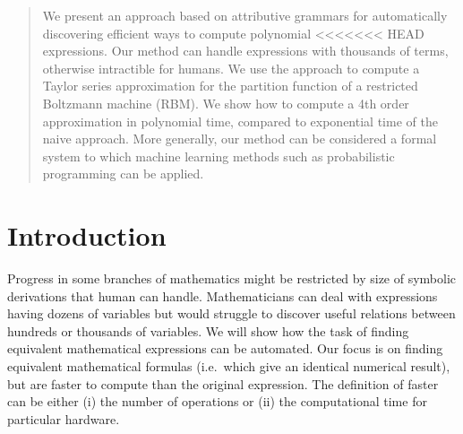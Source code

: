 \documentclass{article}
\begin{document}
 





\vskip 0.3in


\begin{abstract} We present an approach based on attributive grammars
  for automatically discovering efficient ways to compute polynomial
<<<<<<< HEAD
  expressions. Our method can handle expressions with thousands of
  terms, otherwise intractible
  for humans. We use the approach to
  compute a Taylor series approximation for the partition function of
  a restricted Boltzmann machine (RBM). We show how to compute a 4th
  order approximation in polynomial time, compared to exponential time
  of the naive approach. More generally, our method can be considered a
  formal system to which machine learning methods such as
  probabilistic programming can be applied. 
\end{abstract} 

\section{Introduction} \label{introduction} 

Progress in some branches of
mathematics might be restricted by size of symbolic derivations that human can
handle.  Mathematicians can deal with expressions having dozens of
variables but would struggle to discover useful relations between hundreds or
thousands of variables. We will show how the task of finding equivalent
mathematical expressions can be automated. Our focus is on finding equivalent
mathematical formulas (i.e.~which give an identical numerical result),
but are faster to compute than the original expression. The definition
of faster can be either (i) the number of operations or (ii) the computational time
for particular hardware.
\end{document}
